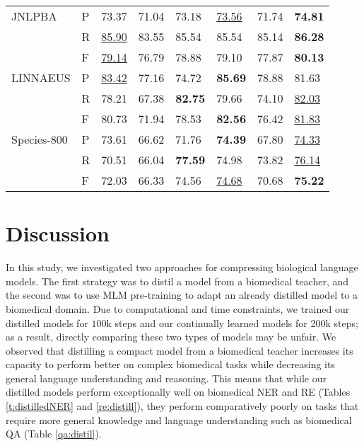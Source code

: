 \documentclass{article}
\begin{document}
\begin{table}[ht!]
{\begin{tabular}{L{2.5cm}P{1.5cm}P{2cm}P{2cm}P{2cm}P{2cm}P{2cm}P{2.5cm}}
        JNLPBA & P & 73.37 & 71.04 & 73.18 & \underline{73.56} & 71.74 & \textbf{74.81}\\
               & R & \underline{85.90} & 83.55 & 85.54 & 85.54 & 85.14 & \textbf{86.28}\\
               & F & \underline{79.14} & 76.79 & 78.88 & 79.10 & 77.87 & \textbf{80.13}\\
        
        LINNAEUS & P & \underline{83.42} & 77.16 & 74.72 & \textbf{85.69} & 78.88 & 81.63\\
                 & R & 78.21 & 67.38 & \textbf{82.75} & 79.66 & 74.10 & \underline{82.03}\\
                 & F & 80.73 & 71.94 & 78.53 & \textbf{82.56} & 76.42 & \underline{81.83}\\
                     
        Species-800 & P & 73.61 & 66.62 & 71.76 & \textbf{74.39} & 67.80 & \underline{74.33}\\
                    & R & 70.51 & 66.04 & \textbf{77.59} & 74.98 & 73.82 & \underline{76.14}\\
                    & F & 72.03 & 66.33 & 74.56 & \underline{74.68} & 70.68 & \textbf{75.22}\\
                   \bottomrule
    \end{tabular}}
    \vspace{10pt}
    
\end{table}









\section{Discussion}
In this study, we investigated two approaches for compressing biological language models.
The first strategy was to distil a model from a biomedical teacher, and the second was to use MLM pre-training to adapt an already distilled model to a biomedical domain. Due to computational and time constraints, we trained our distilled models for $100$k steps and our continually learned models for 200k steps; as a result, directly comparing these two types of models may be unfair. We observed that distilling a compact model from a biomedical teacher increases its capacity to perform better on complex biomedical tasks while decreasing its general language understanding and reasoning. This means that while our distilled models perform exceptionally well on biomedical NER and RE (Tables \ref{t:distilledNER} and \ref{re:distill}), they perform comparatively poorly on tasks that require more general knowledge and language understanding such as biomedical QA (Table \ref{qa:distil}). 
\end{document}
